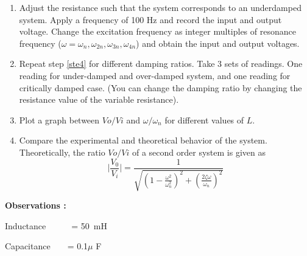\documentclass[11pt]{scrreprt}
\begin{document}
\begin{enumerate}
\begin{enumerate}[label=\roman*]
\item Adjust the resistance such that the system corresponds to an underdamped system. Apply a frequency of 100 Hz and record the input and output voltage. Change the excitation frequency as integer multiples of resonance frequency ($\omega = \omega_n, \omega_{2n}, \omega_{3n}, \omega_{4n}$) and obtain the input and output voltages.\label{ste4}
\item Repeat step \ref{ste4} for different damping ratios. Take 3 sets of readings. One reading for under-damped and over-damped system, and one reading for critically damped case. (You can change the damping ratio by changing the resistance value of the variable resistance).
\item Plot a graph between $Vo/Vi$ and $\omega/ \omega_n$ for different values of $L$.
\item Compare the experimental and theoretical behavior of the system. Theoretically, the ratio $Vo/Vi$ of a second order system is given as
\begin{equation}\label{theoretical gain}
\bigg\lvert{\frac{V_0}{V_i}}\bigg\rvert = \frac{1}{\sqrt{(1-\frac{\omega^2}{\omega_n^2})^2 + (\frac{2\zeta\omega}{\omega_n})^2}}
\end{equation}
\end{enumerate}
\end{enumerate}

\noindent\textbf{Observations :}

Inductance~~~~~~= 50~mH

Capacitance~~~~= 0.1$\mu$ F
\end{document}
